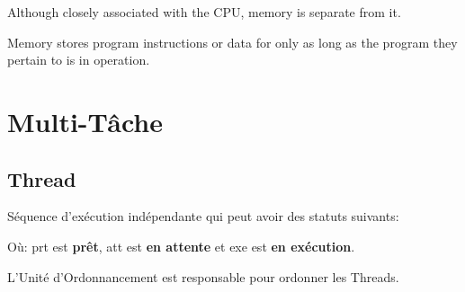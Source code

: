 \documentclass{article}
\begin{document}
\begin{definition}
    \begin{remark}
        Although closely associated with the CPU, memory is separate from it.
    \end{remark}
    
    \begin{remark}
        Memory stores program instructions or data for only as long as the program they pertain to is in operation.
    \end{remark}
\end{definition}



\section{Multi-Tâche}

\subsection{Thread}
\begin{definition}\label{def:thread}
    Séquence d'exécution indépendante qui peut avoir des statuts suivants:
    \begin{figure}[H]
        \centering
    \end{figure}
    Où: prt est \textbf{prêt}, att est \textbf{en attente} et exe est \textbf{en exécution}.
    
    \begin{remark}
        L'Unité d'Ordonnancement est responsable pour ordonner les Threads.
    \end{remark}
\end{definition}
\end{document}
